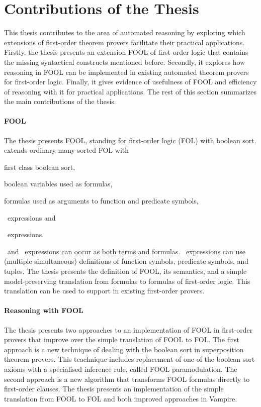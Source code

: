 \section*{Contributions of the Thesis}
\label{sect:intro:contributions}


This thesis contributes to the area of automated reasoning by exploring which extensions of first-order theorem provers facilitate their practical applications. Firstly, the thesis presents an extension FOOL of first-order logic that contains the missing syntactical constructs mentioned before. Secondly, it explores how reasoning in FOOL can be implemented in existing automated theorem provers for first-order logic. Finally, it gives evidence of usefulness of FOOL and efficiency of reasoning with it for practical applications. The rest of this section summarizes the main contributions of the thesis.

\paragraph{FOOL}
The thesis presents FOOL, standing for first-order logic (FOL) with boolean sort. \folb{} extends ordinary many-sorted FOL with \begin{enumerate*}[label=(\roman*)]\item first class boolean sort, \item boolean variables used as formulas, \item formulas used as arguments to function and predicate symbols, \item \ITE\ expressions and \item \LETIN\ expressions.\end{enumerate*} \ITE\ and \LETIN\ expressions can occur as both terms and formulas. \LETIN\ expressions can use (multiple simultaneous) definitions of function symbols, predicate symbols, and tuples. The thesis presents the definition of FOOL, its semantics, and a simple model-preserving translation from \folb{} formulas to formulas of first-order logic. This translation can be used to support \folb{} in existing first-order provers.

\paragraph{Reasoning with FOOL}
The thesis presents two approaches to an implementation of FOOL in first-order provers that improve over the simple translation of FOOL to FOL. The first approach is a new technique of dealing with the boolean sort in superposition theorem provers. This teachnique includes replacement of one of the boolean sort axioms with a specialised inference rule, called FOOL paramodulation. The second approach is a new algorithm \nfcnf{} that transforms FOOL formulas directly to first-order clauses. The thesis presents an implementation of the simple translation from FOOL to FOL and both improved approaches in Vampire.

